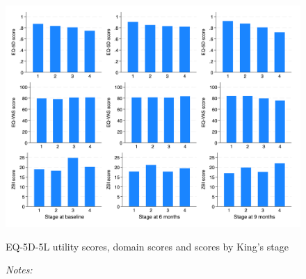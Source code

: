 \documentclass[12pt]{article}
\begin{document}


\hspace{1em}
\begin{figure}[H]
    \centering
    \includegraphics[width=1\linewidth]{figures/outcome-kings-stage.png}
    \caption{EQ-5D-5L utility scores, domain scores and scores by King’s stage}
    \label{fig:outcome-kings-stage}
    \caption*{\footnotesize \textit{Notes:} }
\end{figure}
\end{document}
